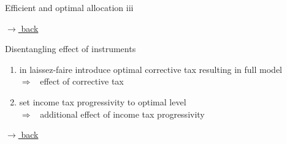 \documentclass[11pt,aspectratio=169]{beamer}
\newcommand{\ar}{$\Rightarrow$ \ }
\begin{document}
\begin{frame}{Efficient and optimal allocation iii}
\begin{minipage}[]{0.3\textwidth}
	\end{minipage}
	
	\vspace{0mm}
	\hfill
	\hyperlink{effalloback}{\tiny{$\rightarrow$ back}} 
\end{frame}

%
\begin{frame}{{Disentangling effect of instruments}}
	\hypertarget{disen}{}
	\begin{enumerate}
				\item<+-> in laissez-faire introduce optimal corrective tax resulting in full model
		\\ \ar effect of corrective tax
		\vspace{3mm}
		\item<+-> set income tax progressivity to optimal level\\ \ar additional effect of income tax progressivity
	\end{enumerate}

	\vspace{10mm}
\hfill
\hyperlink{effalloback}{\tiny{$\rightarrow$ back}} 
\end{frame}
\end{document}
